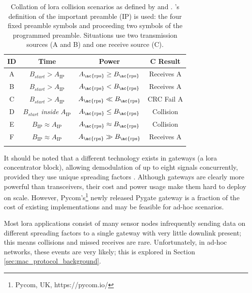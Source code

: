 \begin{table}[H]
\centering\small
\caption[\ac{lora} collision scenarios]{Collation of \ac{lora} collision scenarios as defined by \cite{3YP:LORA_FOR_IOT} and \cite{3YP:LORA_COLLISIONS}. \cite{3YP:LORA_COLLISIONS}'s definition of the important preamble (IP) is used: the four fixed preamble symbols and proceeding two symbols of the programmed preamble. Situations use two transmission sources (A and B) and one receive source (C).}
\begin{tabular}{c|cc|c}
    \toprule
    \textbf{ID} & \textbf{Time} & \textbf{Power} & \textbf{C Result}\\
    \midrule\addlinespace
    A & $B_{start} > A_{\text{IP}}$ & $A_{\text{\ac{rps}}} \geq B_{\text{\ac{rps}}}$ & Receives A \\
    B & $B_{start} > A_{\text{IP}}$ & $A_{\text{\ac{rps}}} < B_{\text{\ac{rps}}}$ &  Receives A \\
    C & $B_{start} > A_{\text{IP}}$ & $A_{\text{\ac{rps}}} \ll B_{\text{\ac{rps}}}$ & CRC Fail A \\
    D & $B_{start}$ \textit{inside} $A_{\text{IP}}$ & $A_{\text{\ac{rps}}} \leq B_{\text{\ac{rps}}}$ & Collision \\
    E & $B_{\text{IP}} \approx A_{\text{IP}}$ & $A_{\text{\ac{rps}}} \approx B_{\text{\ac{rps}}}$ & Collision \\
    F & $B_{\text{IP}} \approx A_{\text{IP}}$ & $A_{\text{\ac{rps}}} \gg B_{\text{\ac{rps}}}$ & Receives A \\
    \addlinespace\bottomrule
\end{tabular}
\label{tab:collisions}
\end{table}

 It should be noted that a different technology exists in gateways (a \ac{lora} concentrator block), allowing demodulation of up to eight signals concurrently, provided they use unique spreading factors \cite{3YP:LORA_SX1301}. Although gateways are clearly more powerful than transceivers, their cost and power usage make them hard to deploy on scale. However, Pycom's\footnote{Pycom, UK,  https://pycom.io/} newly released Pygate gateway is a fraction of the cost of existing implementations and may be feasible for ad-hoc scenarios.

 Most \ac{lora} applications consist of many sensor nodes infrequently sending data on different spreading factors to a single gateway with very little downlink present; this means collisions and missed receives are rare. Unfortunately, in ad-hoc networks, these events are very likely; this is explored in Section \ref{sec:mac_protocol_background}.
\newpage
